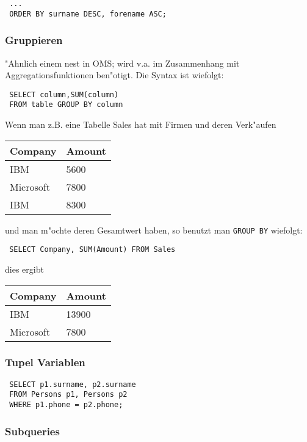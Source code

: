 \documentclass[german, 10pt, a4paper, twocolumn]{scrartcl}
\theoremstyle{definition}
\theoremstyle{remark}
\theoremstyle{example}
\begin{document}
\begin{verbatim}
 ...
 ORDER BY surname DESC, forename ASC;
\end{verbatim}


\subsubsection{Gruppieren}

"Ahnlich einem nest in OMS; wird v.a. im Zusammenhang mit Aggregationsfunktionen ben"otigt. Die Syntax ist wiefolgt:

\begin{verbatim}
 SELECT column,SUM(column)
 FROM table GROUP BY column
\end{verbatim}

Wenn man z.B. eine Tabelle Sales hat mit Firmen und deren Verk"aufen

\begin{center}
\begin{tabular}{l|l}
	Company &	Amount\\ \hline
	IBM &		5600\\
	Microsoft &	7800\\
	IBM &		8300
\end{tabular}
\end{center}

und man m"ochte deren Gesamtwert haben, so benutzt man \verb#GROUP BY# wiefolgt:

\begin{verbatim}
 SELECT Company, SUM(Amount) FROM Sales
\end{verbatim}

dies ergibt
\begin{center}
\begin{tabular}{l|l}
	Company &	Amount\\ \hline
	IBM &		13900\\
	Microsoft &	7800
\end{tabular}
\end{center}


\subsubsection{Tupel Variablen}

\begin{verbatim}
 SELECT p1.surname, p2.surname
 FROM Persons p1, Persons p2
 WHERE p1.phone = p2.phone;
\end{verbatim}


\subsubsection{Subqueries}
\end{document}

